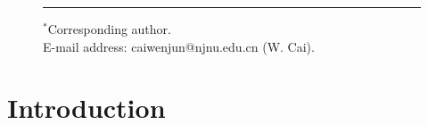 \documentclass[fleqn,11pt]{elsarticle}
\numberwithin{equation}{section}
\begin{document}
\begin{figure}[b]
	\small \baselineskip=10pt
	\rule[2mm]{1.8cm}{0.2mm} \par
	$^{*}$Corresponding author.\\
	E-mail address: caiwenjun@njnu.edu.cn (W. Cai).
\end{figure}


\section{Introduction}


\end{document}
